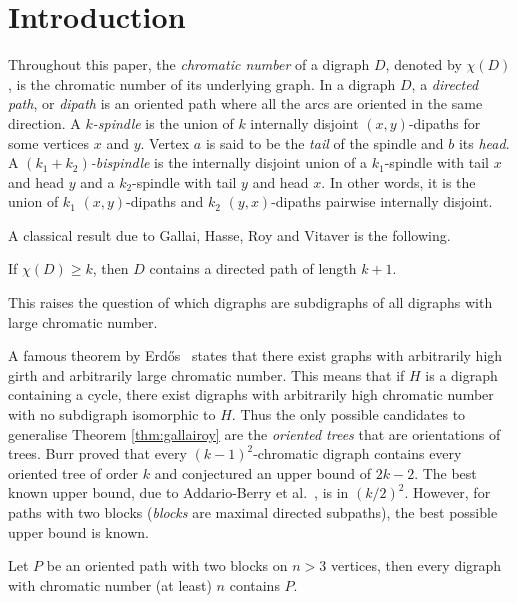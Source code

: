 \documentclass{endm}
\begin{document}
\section{Introduction}
Throughout this paper, the {\it chromatic number} of a digraph $D$, denoted by $\chi(D)$, is the chromatic number of its underlying graph. 
In a digraph $D$, a \emph{directed path}, or \emph{dipath} is an oriented path where all the arcs are oriented in the same direction.
A {\it $k$-spindle} is the union of $k$ internally disjoint $(x,y)$-dipaths for some vertices $x$ and $y$. Vertex $a$ is said to be the {\it tail} of the spindle and $b$ its {\it head}.
A {\it $(k_1+k_2)$-bispindle} is the internally disjoint union of a $k_1$-spindle
with tail $x$ and head $y$ and a  $k_2$-spindle with tail $y$ and head $x$.
In other words, it is the union of $k_1$  $(x,y)$-dipaths and $k_2$ $(y,x)$-dipaths pairwise internally disjoint.

A classical result due to Gallai, Hasse, Roy and Vitaver is the following. 
\begin{theorem}\label{thm:gallairoy}
	If $\chi(D) \geq k$, then $D$ contains a directed path of length $k+1$.  
\end{theorem}   

This raises the question of which digraphs are subdigraphs of all digraphs with large chromatic number.



A famous theorem by Erd\H{o}s~\cite{Erd59} states that there exist graphs with arbitrarily high girth and arbitrarily large
chromatic number. This means that if $H$ is a digraph containing a cycle, there exist digraphs with arbitrarily high 
chromatic number with no subdigraph isomorphic to $H$. Thus the only possible candidates to generalise Theorem \ref{thm:gallairoy} are the {\it oriented trees} that are orientations of trees.
Burr\cite{Burr80} proved that every $(k-1)^2$-chromatic digraph contains every oriented tree of order $k$ 
and conjectured an upper bound of $2k-2$.
The best known upper bound, due to Addario-Berry et al.~\cite{AHS+13}, is in $(k/2)^2$.
However, for paths with two blocks ({\it blocks} are maximal directed subpaths), the best possible upper bound is known.

\begin{theorem}\label{thm:2blocks}
Let $P$ be an oriented path with two blocks on $n > 3$ vertices, then every digraph with chromatic number (at least) $n$ contains $P$. 
\end{theorem}
\end{document}
